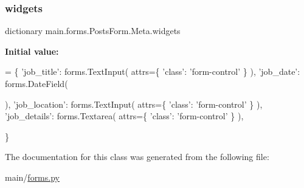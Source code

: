 \mbox{\label{classmain_1_1forms_1_1PostsForm_1_1Meta_ab5ed253773a16d69ea728cfc41e78f89}} 
\subsubsection{\texorpdfstring{widgets}{widgets}}
{\footnotesize\ttfamily dictionary main.\+forms.\+Posts\+Form.\+Meta.\+widgets\hspace{0.3cm}{\ttfamily [static]}}

{\bfseries Initial value\+:}
\begin{DoxyCode}
=  \{
            \textcolor{stringliteral}{'job\_title'}: forms.TextInput(
                attrs=\{
                    \textcolor{stringliteral}{'class'}: \textcolor{stringliteral}{'form-control'}
                    \}
                ),
            \textcolor{stringliteral}{'job\_date'}: forms.DateField(
                
                ),
            \textcolor{stringliteral}{'job\_location'}: forms.TextInput(
                attrs=\{
                    \textcolor{stringliteral}{'class'}: \textcolor{stringliteral}{'form-control'}
                    \}
                ),
            \textcolor{stringliteral}{'job\_details'}: forms.Textarea(
                attrs=\{
                    \textcolor{stringliteral}{'class'}: \textcolor{stringliteral}{'form-control'}
                    \}
                ),

            
            \}
\end{DoxyCode}


The documentation for this class was generated from the following file\+:\begin{DoxyCompactItemize}
\item 
main/\hyperlink{forms_8py}{forms.\+py}\end{DoxyCompactItemize}
